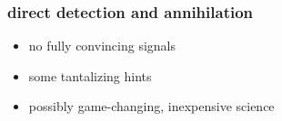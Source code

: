 \documentclass{beamer}
\begin{document}
\begin{frame}
\frametitle{direct detection and annihilation}
\begin{itemize}
\item no fully convincing signals
\item some tantalizing hints
\item possibly game-changing, inexpensive science
\end{itemize}
\end{frame}

{\begin{frame}[plain]~\end{frame}}

{\begin{frame}[plain]~\end{frame}}
\end{document}
